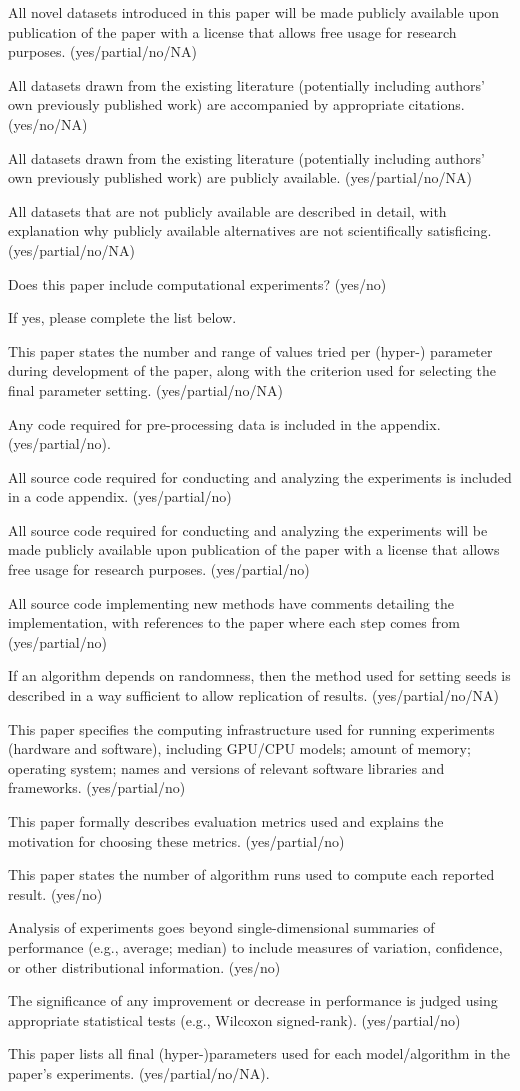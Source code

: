 All novel datasets introduced in this paper will be made publicly available upon publication of the paper with a license that allows free usage for research purposes. (yes/partial/no/NA)

All datasets drawn from the existing literature (potentially including authors' own previously published work) are accompanied by appropriate citations. (yes/no/NA)

All datasets drawn from the existing literature (potentially including authors' own previously published work) are publicly available. (yes/partial/no/NA)

All datasets that are not publicly available are described in detail, with explanation why publicly available alternatives are not scientifically satisficing. (yes/partial/no/NA)

Does this paper include computational experiments? (yes/no)

If yes, please complete the list below.

This paper states the number and range of values tried per (hyper-) parameter during development of the paper, along with the criterion used for selecting the final parameter setting. (yes/partial/no/NA)

Any code required for pre-processing data is included in the appendix. (yes/partial/no).

All source code required for conducting and analyzing the experiments is included in a code appendix. (yes/partial/no)

All source code required for conducting and analyzing the experiments will be made publicly available upon publication of the paper with a license that allows free usage for research purposes. (yes/partial/no)

All source code implementing new methods have comments detailing the implementation, with references to the paper where each step comes from (yes/partial/no)

If an algorithm depends on randomness, then the method used for setting seeds is described in a way sufficient to allow replication of results. (yes/partial/no/NA)

This paper specifies the computing infrastructure used for running experiments (hardware and software), including GPU/CPU models; amount of memory; operating system; names and versions of relevant software libraries and frameworks. (yes/partial/no)

This paper formally describes evaluation metrics used and explains the motivation for choosing these metrics. (yes/partial/no)

This paper states the number of algorithm runs used to compute each reported result. (yes/no)

Analysis of experiments goes beyond single-dimensional summaries of performance (e.g., average; median) to include measures of variation, confidence, or other distributional information. (yes/no)

The significance of any improvement or decrease in performance is judged using appropriate statistical tests (e.g., Wilcoxon signed-rank). (yes/partial/no)

This paper lists all final (hyper-)parameters used for each model/algorithm in the paper's experiments. (yes/partial/no/NA).
